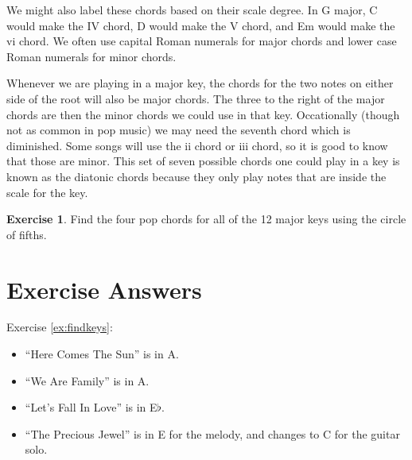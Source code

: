 \documentclass[12pt]{article}
\theoremstyle{definition}
\newtheorem{exercise}{Exercise}
\begin{document}
We might also label these chords based on their scale degree. In G major, C would make the IV chord, D would make the V chord, and Em would make the vi chord. We often use capital Roman numerals for major chords and lower case Roman numerals for minor chords. 

Whenever we are playing in a major key, the chords for the two notes on either side of the root will also be major chords. The three to the right of the major chords are then the minor chords we could use in that key. Occationally (though not as common in pop music) we may need the seventh chord which is diminished. Some songs will use the ii chord or iii chord, so it is good to know that those are minor. 
This set of seven possible chords one could play in a key is known as the diatonic chords because they only play notes that are inside the scale for the key. 

\begin{exercise} \label{ex:fourChords}
Find the four pop chords for all of the 12 major keys using the circle of fifths. 
\end{exercise}



\newpage
\section{Exercise Answers}
Exercise \ref{ex:findkeys}: 
\begin{itemize}
\item``Here Comes The Sun'' is in A. 
\item``We Are Family'' is in A. 
\item``Let's Fall In Love'' is in E$\flat$. 
\item``The Precious Jewel'' is in E for the melody, and changes to C for the guitar solo. 
\end{itemize}
\end{document}

